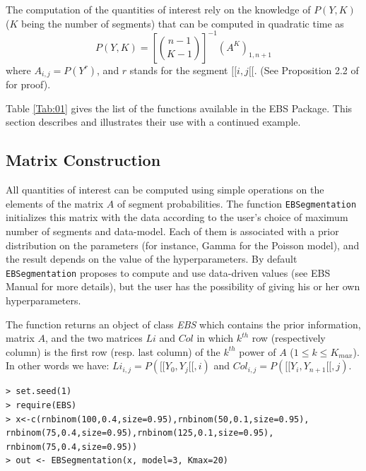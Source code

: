 \documentclass{bioinfo}
\begin{document}
\begin{methods}
The computation of the quantities of interest rely on the knowledge of $P(Y,K)$
($K$ being the number of segments) that can be computed in quadratic
time as
\begin{equation}
 P(Y,K) = \left[{n-1} \choose{K-1} \right]^{-1} \left(A^K \right)_{1,n+1} \label{Proba}
\end{equation} 
where $A_{i,j}=P(Y^r)$, and $r$ stands for the segment $[\![i,j[\![$. (See Proposition 2.2 of \cite{rigaill_exact_2011} for proof).


Table \ref{Tab:01} gives the list of the functions available in the EBS Package. This section describes and illustrates their use with a continued example. 

\subsection{Matrix Construction}

All quantities of interest can be computed using simple operations on the elements of the matrix $A$ of segment probabilities. The function \texttt{EBSegmentation} initializes this matrix with the data according to the user's choice of maximum number of segments and data-model. Each of them is associated with a prior distribution on the parameters (for instance, Gamma for the Poisson model), and the result depends on the value of the hyperparameters. By default \texttt{EBSegmentation} proposes to compute and use data-driven values (see EBS Manual for more details), but the user has the possibility of giving his or her own hyperparameters.

The function returns an object of class \textit{EBS} which contains the prior information, matrix $A$, and the two matrices $Li$ and $Col$ in
 which $k^{th}$ row (respectively column) is the first row (resp. last column) of the $k^{th}$ power of $A$ ($1\leq k \leq K_{max}$). 
In other words we have: $Li_{i,j}=P([\![Y_0,Y_j[\![,i)$ and $Col_{i,j}=P([\![Y_i,Y_{n+1}[\![,j)$.

\begin{verbatim}
> set.seed(1)
> require(EBS)
> x<-c(rnbinom(100,0.4,size=0.95),rnbinom(50,0.1,size=0.95),
rnbinom(75,0.4,size=0.95),rnbinom(125,0.1,size=0.95),
rnbinom(75,0.4,size=0.95))
> out <- EBSegmentation(x, model=3, Kmax=20)
\end{verbatim}



\end{methods}
\end{document}
